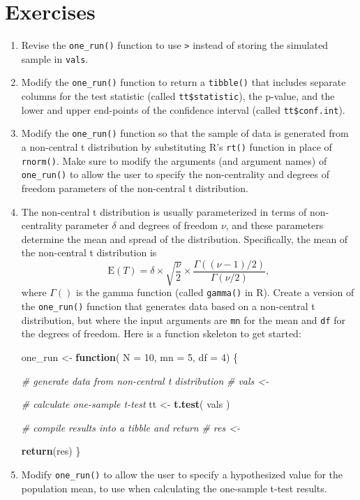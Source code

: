 \documentclass[
]{book}
\newenvironment{Shaded}{\begin{snugshade}}{\end{snugshade}}
\newcommand{\AttributeTok}[1]{\textcolor[rgb]{0.13,0.29,0.53}{#1}}
\newcommand{\CommentTok}[1]{\textcolor[rgb]{0.56,0.35,0.01}{\textit{#1}}}
\newcommand{\ControlFlowTok}[1]{\textcolor[rgb]{0.13,0.29,0.53}{\textbf{#1}}}
\newcommand{\DecValTok}[1]{\textcolor[rgb]{0.00,0.00,0.81}{#1}}
\newcommand{\FunctionTok}[1]{\textcolor[rgb]{0.13,0.29,0.53}{\textbf{#1}}}
\newcommand{\NormalTok}[1]{#1}
\newcommand{\OtherTok}[1]{\textcolor[rgb]{0.56,0.35,0.01}{#1}}
\begin{document}
\section{Exercises}\label{exercises}

\begin{enumerate}
\def\labelenumi{\arabic{enumi}.}
\item
  Revise the \texttt{one\_run()} function to use \texttt{\textbar{}\textgreater{}} instead of storing the simulated sample in \texttt{vals}.
\item
  Modify the \texttt{one\_run()} function to return a \texttt{tibble()} that includes separate columns for the test statistic (called \texttt{tt\$statistic}), the p-value, and the lower and upper end-points of the confidence interval (called \texttt{tt\$conf.int}).
\item
  Modify the \texttt{one\_run()} function so that the sample of data is generated from a non-central t distribution by substituting R's \texttt{rt()} function in place of \texttt{rnorm()}. Make sure to modify the arguments (and argument names) of \texttt{one\_run()} to allow the user to specify the non-centrality and degrees of freedom parameters of the non-central t distribution.
\item
  The non-central t distribution is usually parameterized in terms of non-centrality parameter \(\delta\) and degrees of freedom \(\nu\), and these parameters determine the mean and spread of the distribution. Specifically, the mean of the non-central t distribution is
  \[\text{E}(T) = \delta \times \sqrt{\frac{\nu}{2}} \times \frac{\Gamma((\nu - 1) / 2)}{\Gamma(\nu / 2)},\]
  where \(\Gamma()\) is the gamma function (called \texttt{gamma()} in R). Create a version of the \texttt{one\_run()} function that generates data based on a non-central t distribution, but where the input arguments are \texttt{mn} for the mean and \texttt{df} for the degrees of freedom. Here is a function skeleton to get started:

\begin{Shaded}
\begin{Highlighting}[]
\NormalTok{one\_run }\OtherTok{\textless{}{-}} \ControlFlowTok{function}\NormalTok{( }\AttributeTok{N =} \DecValTok{10}\NormalTok{, }\AttributeTok{mn =} \DecValTok{5}\NormalTok{, }\AttributeTok{df =} \DecValTok{4}\NormalTok{) \{}

  \CommentTok{\# generate data from non{-}central t distribution}
  \CommentTok{\# vals \textless{}{-} }

  \CommentTok{\# calculate one{-}sample t{-}test}
\NormalTok{  tt }\OtherTok{\textless{}{-}} \FunctionTok{t.test}\NormalTok{( vals )}

  \CommentTok{\# compile results into a tibble and return}
  \CommentTok{\# res \textless{}{-} }

  \FunctionTok{return}\NormalTok{(res)}
\NormalTok{\}}
\end{Highlighting}
\end{Shaded}
\item
  Modify \texttt{one\_run()} to allow the user to specify a hypothesized value for the population mean, to use when calculating the one-sample t-test results.
\end{enumerate}
\end{document}
